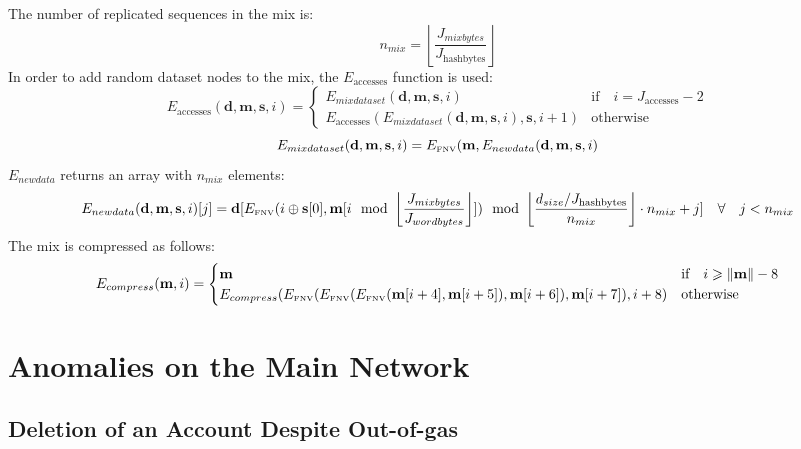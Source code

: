 \documentclass[9pt,oneside]{amsart}
\begin{document}
The number of replicated sequences in the mix is:
\begin{equation}
 n_{mix} =  \left\lfloor\frac{J_{mixbytes}}{J_{\mathrm{hashbytes}}}\right\rfloor
\end{equation}
In order to add random dataset nodes to the mix, the $E_{\mathrm{accesses}}$ function is used:
\begin{equation}
 E_{\mathrm{accesses}}(\mathbf{d}, \mathbf{m}, \mathbf{s}, i) = \begin{cases}
E_{mixdataset}(\mathbf{d}, \mathbf{m},  \mathbf{s}, i) & \text{if} \quad i = J_{\mathrm{accesses}} -2 \\
E_{\mathrm{accesses}}(E_{mixdataset}(\mathbf{d}, \mathbf{m}, \mathbf{s}, i), \mathbf{s}, i + 1) & \text{otherwise}
\end{cases}
\end{equation}
\begin{equation}
 E_{mixdataset}(\mathbf{d}, \mathbf{m}, \mathbf{s}, i) = E_\text{\tiny FNV}(\mathbf{m}, E_{newdata}(\mathbf{d}, \mathbf{m}, \mathbf{s}, i)
\end{equation}
$E_{newdata}$ returns an array with $n_{mix}$ elements:
\begin{equation}
 E_{newdata}(\mathbf{d}, \mathbf{m}, \mathbf{s}, i)[j] = \mathbf{d}[E_\text{\tiny FNV}(i \oplus \mathbf{s}[0], \mathbf{m}[i \mod \left\lfloor\frac{J_{mixbytes}}{J_{wordbytes}}\right\rfloor]) \mod \left\lfloor\frac{d_{size} / J_{\mathrm{hashbytes}}}{n_{mix}}\right\rfloor \cdot n_{mix} + j] \quad \forall \quad j < n_{mix}
\end{equation}
The mix is compressed as follows:
\begin{equation}
 E_{compress}(\mathbf{m}, i) = \begin{cases}
\mathbf{m} & \text{if} \quad i \geqslant \lVert \mathbf{m} \rVert - 8 \\
E_{compress}(E_\text{\tiny FNV}(E_\text{\tiny FNV}(E_\text{\tiny FNV}(\mathbf{m}[i + 4], \mathbf{m}[i + 5]), \mathbf{m}[i + 6]), \mathbf{m}[i + 7]), i + 8) & \text{otherwise}
\end{cases}
\end{equation}

\section{Anomalies on the Main Network}

\subsection{Deletion of an Account Despite Out-of-gas}
\end{document}
